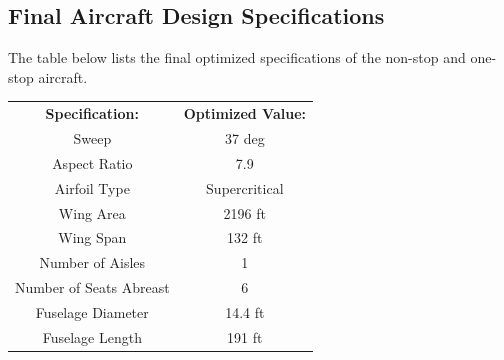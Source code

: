 \documentclass{article}
\begin{document}
    \subsection{Final Aircraft Design Specifications}
    \label{sec:optimized}

        \begin{flushleft}
            The table below lists the final optimized specifications of the
            non-stop and one-stop aircraft.
        \end{flushleft}

        \begin{table}[ht]
            \begin{tabular}{|c|c|}
                \hline
                \rowcolor[HTML]{FFC702}
                \multicolumn{2}{|c|}{\cellcolor[HTML]{FFC702}\textbf{Non-stop Aircraft}} \\ \hline
                \textbf{Specification:}            & \textbf{Optimized Value:}           \\ \hline
                Sweep                              & 37 deg                              \\ \hline
                \rowcolor[HTML]{C0C0C0}
                Aspect Ratio                       & 7.9                                 \\ \hline
                \rowcolor[HTML]{FFFFFF}
                Airfoil Type                       & Supercritical                       \\ \hline
                \rowcolor[HTML]{C0C0C0}
                Wing Area                          & 2196 ft                             \\ \hline
                \rowcolor[HTML]{FFFFFF}
                Wing Span                          & 132 ft                              \\ \hline
                \rowcolor[HTML]{C0C0C0}
                Number of Aisles                   & 1                                   \\ \hline
                \rowcolor[HTML]{FFFFFF}
                Number of Seats Abreast            & 6                                   \\ \hline
                \rowcolor[HTML]{C0C0C0}
                Fuselage Diameter                  & 14.4 ft                             \\ \hline
                \rowcolor[HTML]{FFFFFF}
                Fuselage Length                    & 191 ft                              \\ \hline

\end{tabular}
\end{table}
\end{document}
